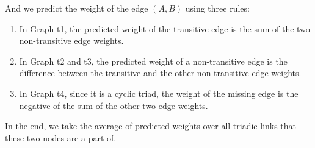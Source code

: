 And we predict the weight of the edge $(A, B)$ using three rules:

\begin{enumerate}

\item In Graph t1, the predicted weight of the transitive edge is the sum of the two non-transitive edge weights.

\item In Graph t2 and t3, the predicted weight of a non-transitive edge is the difference between the transitive and the other non-transitive edge weights. 

\item In Graph t4, since it is a cyclic triad, the weight of the missing edge is the negative of the sum of the other two edge weights.

\end{enumerate}

In the end, we take the average of predicted weights over all triadic-links that these two nodes are a part of.



